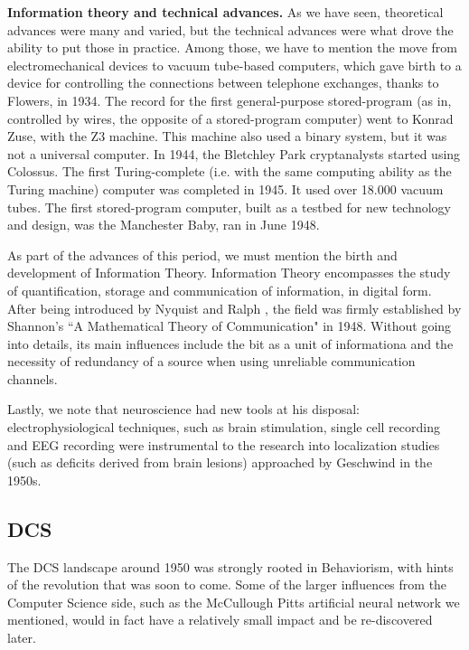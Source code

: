 \documentclass[../main.tex]{subfiles}
\begin{document}
\vspace{4pt}
\textbf{Information theory and technical advances.}
As we have seen, theoretical advances were many and varied, but the technical advances were what drove the ability to put those in practice. Among those, we have to mention the move from electromechanical devices to vacuum tube-based computers, which gave birth to a device for controlling the connections between telephone exchanges, thanks to Flowers, in 1934. The record for the first general-purpose stored-program (as in, controlled by wires, the opposite of a stored-program computer) went to Konrad Zuse, with the Z3 machine. This machine also used a binary system, but it was not a universal computer. In 1944, the Bletchley Park cryptanalysts started using Colossus. The first Turing-complete (i.e. with the same computing ability as the Turing machine) computer was completed in 1945. It used over 18.000 vacuum tubes. The first stored-program computer, built as a testbed for new technology and design, was the Manchester Baby, ran in June 1948\cite{ComputerResurrectionIssue2012}.

As part of the advances of this period, we must mention the birth and development of Information Theory. Information Theory encompasses the study of quantification, storage and communication of information, in digital form. After being introduced by Nyquist and Ralph \cite{nyquistCertainTopicsTelegraph1928}, the field was firmly established by Shannon's ``A Mathematical Theory of Communication" in 1948. Without going into details, its main influences include the bit as a unit of informationa and the necessity of redundancy of a source when using unreliable communication channels.

Lastly, we note that neuroscience had new tools at his disposal: electrophysiological techniques, such as brain stimulation, single cell recording and EEG recording \cite{InternationalEncyclopediaSocial} were instrumental to the research into localization studies (such as deficits derived from brain lesions) approached by Geschwind in the 1950s.

\subsection{DCS}
The DCS landscape around 1950 was strongly rooted in Behaviorism, with hints of the revolution that was soon to come. Some of the larger influences from the Computer Science side, such as the McCullough Pitts artificial neural network we mentioned, would in fact have a relatively small impact and be re-discovered later.
\end{document}
